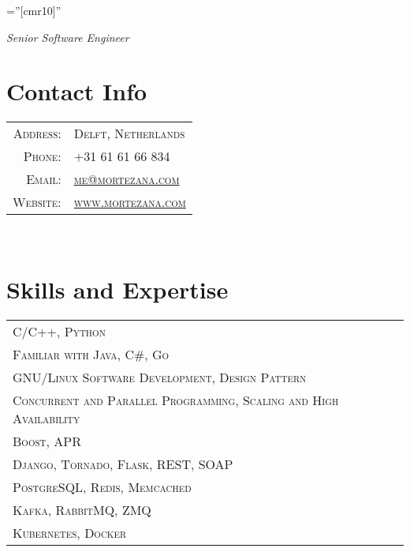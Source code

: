 \documentclass[a4paper,11pt]{article}
\begin{document}
\pagestyle{empty}    %
\font\fb=''[cmr10]'' %

\par {\bigskip \emph{Senior Software Engineer} \par}

\section{Contact Info}
\begin{tabular}{rl}

    \textsc{Address:}     & \textsc{Delft, Netherlands}\\
    \textsc{Phone:}       & \textsc{+31 61 61 66 834}\\
    \textsc{Email:}       & \textsc{\href{mailto:me@mortezana.com}{me@mortezana.com}}\\
    \textsc{Website:}     & \textsc{\href{https://mortezana.com}{www.mortezana.com}}\\

\end{tabular}\\

\section{Skills and Expertise}
\begin{tabular}{lr}

    \textsc{C/C++, Python}\\
    \textsc{Familiar with Java, C\#, Go}\\
    \textsc{GNU/Linux Software Development, Design Pattern}\\
    \textsc{Concurrent and Parallel Programming, Scaling and High Availability}\\
    \textsc{Boost, APR}\\
    \textsc{Django, Tornado, Flask, REST, SOAP}\\
    \textsc{PostgreSQL, Redis, Memcached}\\
    \textsc{Kafka, RabbitMQ, ZMQ}\\
    \textsc{Kubernetes, Docker}\\

\end{tabular}\\
\end{document}
